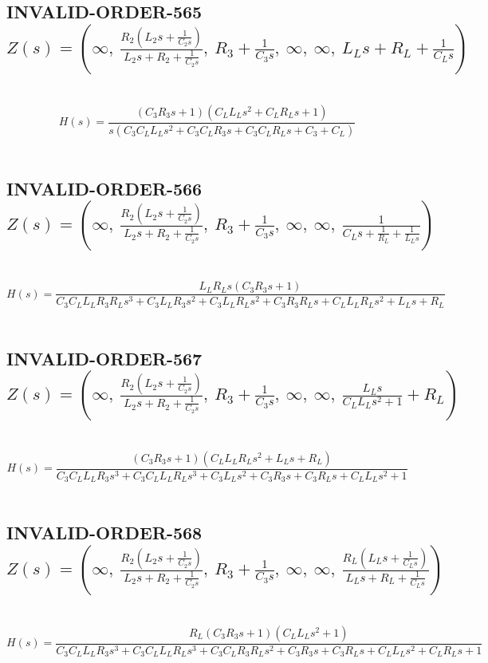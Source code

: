 \documentclass{article}
\begin{document}
\subsection{INVALID-ORDER-565 $Z(s) = \left( \infty, \  \frac{R_{2} \left(L_{2} s + \frac{1}{C_{2} s}\right)}{L_{2} s + R_{2} + \frac{1}{C_{2} s}}, \  R_{3} + \frac{1}{C_{3} s}, \  \infty, \  \infty, \  L_{L} s + R_{L} + \frac{1}{C_{L} s}\right)$ } \ 
\textbf{\[H(s) = \frac{\left(C_{3} R_{3} s + 1\right) \left(C_{L} L_{L} s^{2} + C_{L} R_{L} s + 1\right)}{s \left(C_{3} C_{L} L_{L} s^{2} + C_{3} C_{L} R_{3} s + C_{3} C_{L} R_{L} s + C_{3} + C_{L}\right)}\] } \ 
\subsection{INVALID-ORDER-566 $Z(s) = \left( \infty, \  \frac{R_{2} \left(L_{2} s + \frac{1}{C_{2} s}\right)}{L_{2} s + R_{2} + \frac{1}{C_{2} s}}, \  R_{3} + \frac{1}{C_{3} s}, \  \infty, \  \infty, \  \frac{1}{C_{L} s + \frac{1}{R_{L}} + \frac{1}{L_{L} s}}\right)$ } \ 
\textbf{\[H(s) = \frac{L_{L} R_{L} s \left(C_{3} R_{3} s + 1\right)}{C_{3} C_{L} L_{L} R_{3} R_{L} s^{3} + C_{3} L_{L} R_{3} s^{2} + C_{3} L_{L} R_{L} s^{2} + C_{3} R_{3} R_{L} s + C_{L} L_{L} R_{L} s^{2} + L_{L} s + R_{L}}\] } \ 
\subsection{INVALID-ORDER-567 $Z(s) = \left( \infty, \  \frac{R_{2} \left(L_{2} s + \frac{1}{C_{2} s}\right)}{L_{2} s + R_{2} + \frac{1}{C_{2} s}}, \  R_{3} + \frac{1}{C_{3} s}, \  \infty, \  \infty, \  \frac{L_{L} s}{C_{L} L_{L} s^{2} + 1} + R_{L}\right)$ } \ 
\textbf{\[H(s) = \frac{\left(C_{3} R_{3} s + 1\right) \left(C_{L} L_{L} R_{L} s^{2} + L_{L} s + R_{L}\right)}{C_{3} C_{L} L_{L} R_{3} s^{3} + C_{3} C_{L} L_{L} R_{L} s^{3} + C_{3} L_{L} s^{2} + C_{3} R_{3} s + C_{3} R_{L} s + C_{L} L_{L} s^{2} + 1}\] } \ 
\subsection{INVALID-ORDER-568 $Z(s) = \left( \infty, \  \frac{R_{2} \left(L_{2} s + \frac{1}{C_{2} s}\right)}{L_{2} s + R_{2} + \frac{1}{C_{2} s}}, \  R_{3} + \frac{1}{C_{3} s}, \  \infty, \  \infty, \  \frac{R_{L} \left(L_{L} s + \frac{1}{C_{L} s}\right)}{L_{L} s + R_{L} + \frac{1}{C_{L} s}}\right)$ } \ 
\textbf{\[H(s) = \frac{R_{L} \left(C_{3} R_{3} s + 1\right) \left(C_{L} L_{L} s^{2} + 1\right)}{C_{3} C_{L} L_{L} R_{3} s^{3} + C_{3} C_{L} L_{L} R_{L} s^{3} + C_{3} C_{L} R_{3} R_{L} s^{2} + C_{3} R_{3} s + C_{3} R_{L} s + C_{L} L_{L} s^{2} + C_{L} R_{L} s + 1}\] } \ 
\end{document}
